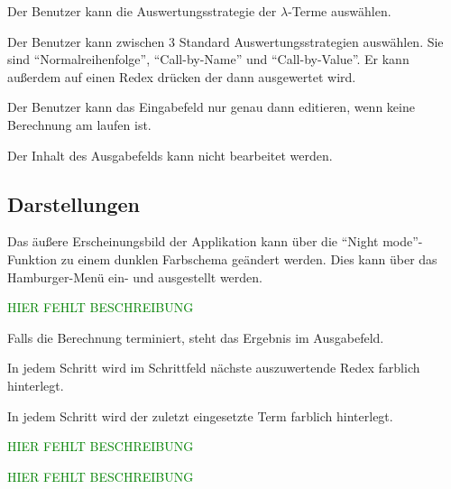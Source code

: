 \documentclass[parskip=full,11pt,twoside]{scrartcl}
\begin{document}
Der Benutzer kann die Auswertungsstrategie der $\lambda$-Terme auswählen.

Der Benutzer kann zwischen 3 Standard Auswertungsstrategien auswählen. Sie sind \enquote{Normalreihenfolge}, \enquote{Call-by-Name} und \enquote{Call-by-Value}.
Er kann außerdem auf einen Redex drücken der dann ausgewertet wird.


Der Benutzer kann das Eingabefeld nur genau dann editieren, wenn keine Berechnung am laufen ist.

Der Inhalt des Ausgabefelds kann nicht bearbeitet werden.


\subsection{Darstellungen}
Das äußere Erscheinungsbild der Applikation kann über die \enquote{Night mode}-Funktion zu einem dunklen Farbschema geändert werden. Dies kann über das Hamburger-Menü ein- und ausgestellt werden.

\textcolor{green}{HIER FEHLT BESCHREIBUNG}

Falls die Berechnung terminiert, steht das Ergebnis im Ausgabefeld.


In jedem Schritt wird im Schrittfeld nächste auszuwertende Redex farblich hinterlegt.

In jedem Schritt wird der zuletzt eingesetzte Term farblich hinterlegt.

\textcolor{green}{HIER FEHLT BESCHREIBUNG}

\textcolor{green}{HIER FEHLT BESCHREIBUNG}
\end{document}
